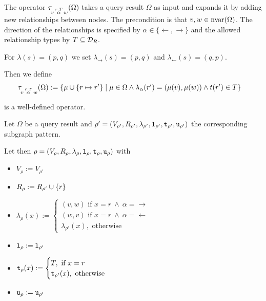 \begin{definition}
\label{def:traverse}

The  operator $\tau\!_{v\, \overset{r:T}{\alpha} \, w}(\Omega)$ takes a query
result $\Omega$ as input and expands it by adding new relationships between nodes.
The precondition is that $v,w \in \textnormal{nvar}(\Omega)$.
The direction of the relationships is specified by
$\alpha \in \{\leftarrow, \rightarrow\}$
and the allowed relationship types by
$T \subseteq \mathcal{D}_R$.

For $\lambda(s) = (p, q)$ we set $\lambda_\rightarrow(s) = (p, q)$ and
$\lambda_\leftarrow(s) = (q, p)$.

Then we define
\begin{align*}
  \tau\!_{v\, \overset{r:T}{\alpha} \, w}(\Omega) := \{ &\mu \cup \{ r \mapsto r' \} \mid
    \mu \in \Omega \land \lambda_\alpha(r') = (\mu(v), \mu(w)) \land t(r') \in T \}
\end{align*}

\begin{proofof}{ is a well-defined operator.}
\label{proof:traverse-well-defined}

Let $\Omega$ be a query result and
$\rho' = (V_{\rho'}, R_{\rho'}, \lambda_{\rho'}, \texttt{l}_{\rho'}, \texttt{t}_{\rho'}, \texttt{u}_{\rho'})$
the corresponding subgraph pattern.

Let then $\rho = (V_\rho, R_\rho, \lambda_\rho, \texttt{l}_\rho, \texttt{t}_\rho, \texttt{u}_\rho)$
with
\begin{itemize}[label={}]
  \item $V_\rho := V_{\rho'}$
  \item $R_\rho := R_{\rho'} \cup \{ r \}$
  \item $\lambda_\rho(x) := \begin{cases}
                              (v, w) \text{ if } x = r ~\land~ \alpha = \rightarrow \\
                              (w, v) \text{ if } x = r ~\land~ \alpha = \leftarrow \\
                              \lambda_{\rho'}(x), \text{ otherwise}
                            \end{cases}$
  \item $\texttt{l}_\rho := \texttt{l}_{\rho'}$
  \item $\texttt{t}_\rho(x) := \begin{cases}
                              T, \text{ if } x = r \\
                              \texttt{t}_{\rho'}(x), \text{ otherwise}
                           \end{cases}$
  \item $\texttt{u}_\rho := \texttt{u}_{\rho'}$
\end{itemize}


\end{proofof}
\end{definition}
